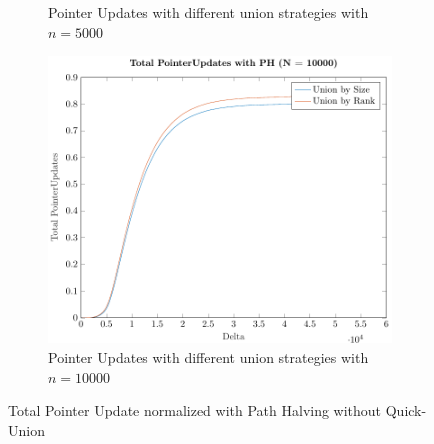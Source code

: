 \begin{figure}[ht]
\begin{subfigure}{0.32\textwidth}
        \caption{Pointer Updates with different union strategies with $n = 5000$}
    \end{subfigure}%
    \hfill
    \begin{subfigure}{0.32\textwidth}
        \centering
        \includegraphics[width=\textwidth]{../images/plotPHNonFull10000_PointerUpdates.pdf}
        \caption{Pointer Updates with different union strategies with $n = 10000$}
    \end{subfigure}

    \caption{Total Pointer Update normalized with Path Halving without Quick-Union}
    \label{fig:tpuPHNoQU}
\end{figure}
